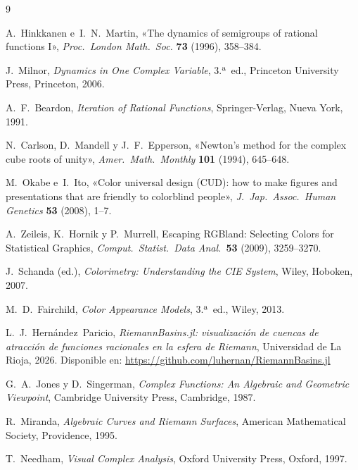 \documentclass[11pt,a4paper]{article}
\theoremstyle{plain}
\theoremstyle{definition}
\theoremstyle{remark}
\begin{document}
\begin{thebibliography}{9}

A.~Hinkkanen e~I.~N.~Martin,
«The dynamics of semigroups of rational functions I»,
\textit{Proc.\ London Math.\ Soc.} \textbf{73} (1996), 358--384.

J.~Milnor,
\textit{Dynamics in One Complex Variable},
3.ª~ed., Princeton University Press, Princeton, 2006.

A.~F.~Beardon,
\textit{Iteration of Rational Functions},
Springer-Verlag, Nueva York, 1991.

N.~Carlson, D.~Mandell y J.~F.~Epperson,
«Newton's method for the complex cube roots of unity»,
\textit{Amer.\ Math.\ Monthly} \textbf{101} (1994), 645--648.

M.~Okabe e~I.~Ito,
«Color universal design (CUD): how to make figures and presentations
that are friendly to colorblind people»,
\textit{J.\ Jap.\ Assoc.\ Human Genetics} \textbf{53} (2008), 1--7.

A.~Zeileis, K.~Hornik y P.~Murrell,
\guillemotleft Escaping RGBland: Selecting Colors for Statistical
Graphics\guillemotright,
\textit{Comput.\ Statist.\ Data Anal.}\ \textbf{53} (2009),
3259--3270.

J.~Schanda (ed.),
\textit{Colorimetry: Understanding the CIE System},
Wiley, Hoboken, 2007.

M.~D.~Fairchild,
\textit{Color Appearance Models},
3.ª~ed., Wiley, 2013.

L.~J.~Hernández~Paricio,
\textit{RiemannBasins.jl: visualización de cuencas de atracción de
funciones racionales en la esfera de Riemann},
Universidad de La Rioja, 2026.
Disponible en: \url{https://github.com/luhernan/RiemannBasins.jl}


G.~A.~Jones y D.~Singerman,
\textit{Complex Functions: An Algebraic and Geometric Viewpoint},
Cambridge University Press, Cambridge, 1987.

R.~Miranda,
\textit{Algebraic Curves and Riemann Surfaces},
American Mathematical Society, Providence, 1995.

T.~Needham,
\textit{Visual Complex Analysis},
Oxford University Press, Oxford, 1997.

\end{thebibliography}
\end{document}
